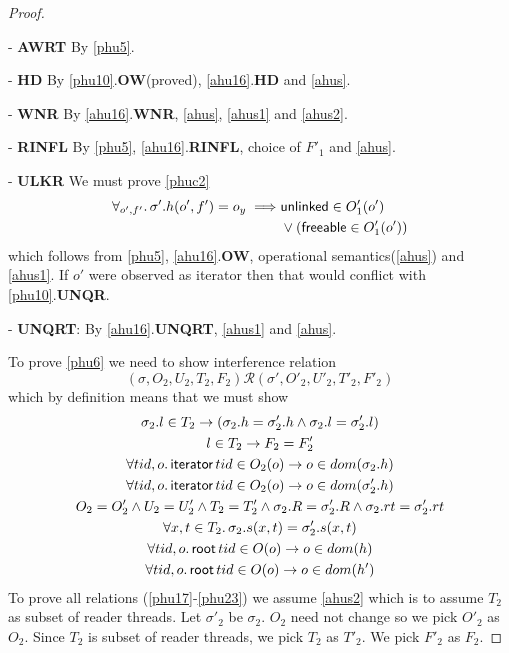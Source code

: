 \begin{proof}
\begin{case} - \textbf{AWRT} By \ref{phu5}.
\end{case}
\begin{case} - \textbf{HD} By \ref{phu10}.\textbf{OW}(proved), \ref{ahu16}.\textbf{HD}  and \ref{ahus}. 
\end{case}
\begin{case} - \textbf{WNR} By \ref{ahu16}.\textbf{WNR}, \ref{ahus}, \ref{ahus1} and \ref{ahus2}.
\end{case}
\begin{case} - \textbf{RINFL} By \ref{phu5}, \ref{ahu16}.\textbf{RINFL}, choice of $F'_1$ and \ref{ahus}.
\end{case}
\begin{case} - \textbf{ULKR} We must prove \ref{phuc2}
  \begin{gather}\label{phuc2}
    \begin{aligned}
      \forall_{o',f'} \ldotp \sigma'.h(o',f') = o_y \implies & \textsf{unlinked} \in O'_1(o')  \\
      &\lor (\textsf{freeable} \in O'_1(o'))
      \end{aligned}
\end{gather}
which follows from \ref{phu5}, \ref{ahu16}.\textbf{OW}, operational semantics(\ref{ahus}) and \ref{ahus1}. If $o'$ were observed as \textsf{iterator} then that would conflict with \ref{phu10}.\textbf{UNQR}. 
\end{case}
\begin{case} - \textbf{UNQRT}: By \ref{ahu16}.\textbf{UNQRT}, \ref{ahus1} and \ref{ahus}.
\end{case}
To prove \ref{phu6} we need to show interference relation
\[(\sigma, O_2, U_2, T_2,F_2) \mathcal{R} (\sigma', O'_2, U'_2, T'_2,F'_2)  \]
which by definition means that we must show 
\begin{gather}\label{phu17}
  \sigma_2.l  \in  T_2 \rightarrow (\sigma_2.h =\sigma'_2.h \land \sigma_2.l=\sigma'_2.l)\\
  \label{phu18}
  l\in T_2\rightarrow F_2=F_2'\\
  \label{phu20}
  \forall tid,o\ldotp\textsf{iterator} \, tid \in O_2(o) \rightarrow o \in dom(\sigma_2.h) \\
  \label{phu21}
  \forall tid,o\ldotp\textsf{iterator} \, tid \in O_2(o) \rightarrow o \in dom(\sigma'_2.h) \\
  \label{phu22}
  O_2 = O_2' \land U_2 = U_2' \land T_2 = T_2' \land \sigma_2.R = \sigma'_2.R \land \sigma_2.rt = \sigma'_2.rt \\
  \label{phu23}
  \forall x, t \in T_2 \ldotp \sigma_2.s(x,t) = \sigma'_2.s(x,t) \\
  \label{phurt1}
  \forall tid,o\ldotp\textsf{root} \, tid \in O(o) \rightarrow o \in dom(h) \\
  \label{phurt2}
  \forall tid,o\ldotp\textsf{root} \, tid \in O(o) \rightarrow o \in dom(h') 
\end{gather}
To prove all relations (\ref{phu17}-\ref{phu23}) we assume \ref{ahus2} which is to assume $T_2$ as subset of reader threads. Let $\sigma'_2$ be $\sigma_2$. $O_2$ need not change so we pick $O'_2$  as $O_2$. Since $T_2$ is subset of reader threads, we pick $T_2$ as  $T'_2$. We pick $F'_2$ as $F_2$.


\end{proof}
